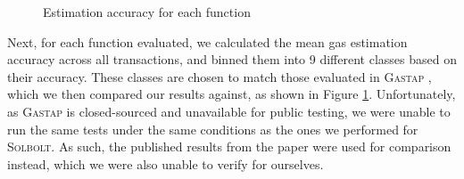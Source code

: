 \begin{figure}[h]
  \centering
  \qquad
  \caption{Estimation accuracy for each function}%
  \label{fig:eval_fn_accuracy}%
\end{figure}

Next, for each function evaluated, we calculated the mean gas estimation accuracy across all transactions,
and binned them into 9 different classes based on their accuracy. These classes are chosen to match those 
evaluated in \textsc{Gastap} \cite{dontrunonfumes}, which we then compared our results against, as shown in
Figure \ref{fig:eval_fn_accuracy}. Unfortunately, as \textsc{Gastap} is closed-sourced and unavailable for 
public testing, we were unable to run the same tests under the same conditions as the ones we 
performed for \textcolor{NavyBlue}{\textsc{Solbolt}}. As such, the published results from the paper were used for comparison instead,
which we were also unable to verify for ourselves.

